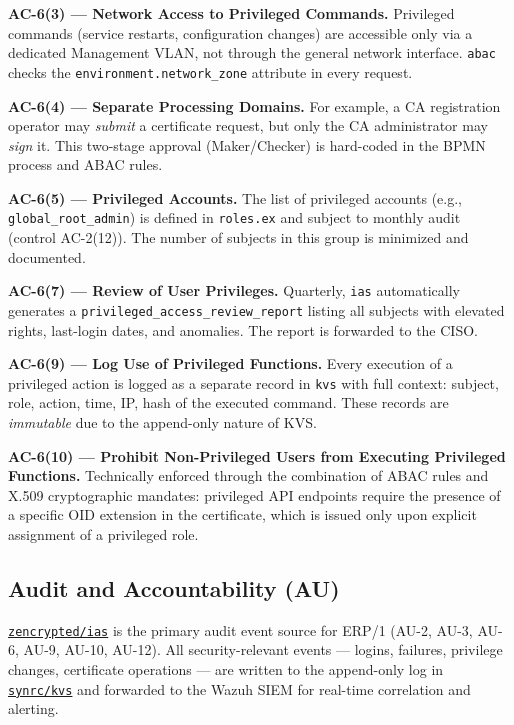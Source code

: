 \documentclass{article}
\begin{document}
\textbf{AC-6(3) --- Network Access to Privileged Commands.}
Privileged commands (service restarts, configuration changes) are accessible only via a dedicated Management VLAN, not through the general network interface. \texttt{abac} checks the \texttt{environment.network\_zone} attribute in every request.

\textbf{AC-6(4) --- Separate Processing Domains.}
For example, a CA registration operator may \textit{submit} a certificate request, but only the CA administrator may \textit{sign} it. This two-stage approval (Maker/Checker) is hard-coded in the BPMN process and ABAC rules.

\textbf{AC-6(5) --- Privileged Accounts.}
The list of privileged accounts (e.g., \texttt{global\_root\_admin}) is defined in \texttt{roles.ex} and subject to monthly audit (control AC-2(12)). The number of subjects in this group is minimized and documented.

\textbf{AC-6(7) --- Review of User Privileges.}
Quarterly, \texttt{ias} automatically generates a \texttt{privileged\_access\_review\_report} listing all subjects with elevated rights, last-login dates, and anomalies. The report is forwarded to the CISO.

\textbf{AC-6(9) --- Log Use of Privileged Functions.}
Every execution of a privileged action is logged as a separate record in \texttt{kvs} with full context: subject, role, action, time, IP, hash of the executed command. These records are \textit{immutable} due to the append-only nature of KVS.

\textbf{AC-6(10) --- Prohibit Non-Privileged Users from Executing Privileged Functions.}
Technically enforced through the combination of ABAC rules and X.509 cryptographic mandates: privileged API endpoints require the presence of a specific OID extension in the certificate, which is issued only upon explicit assignment of a privileged role.


\subsection{Audit and Accountability (AU)}

\href{https://github.com/zencrypted/ias}{\texttt{zencrypted/ias}} is the primary audit event source for ERP/1 (AU-2, AU-3, AU-6, AU-9, AU-10, AU-12). All security-relevant events — logins, failures, privilege changes, certificate operations — are written to the append-only log in \href{https://github.com/synrc/kvs}{\texttt{synrc/kvs}} and forwarded to the Wazuh SIEM for real-time correlation and alerting.
\end{document}
